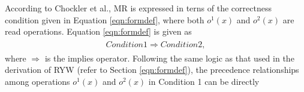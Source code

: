 \documentclass[journal,compsoc]{IEEEtran}
\begin{document}
 \par  According to Chockler et al.,
 MR is expressed in terns of the correctness condition given in Equation \ref{eqn:formdef}, %
 where both $\mathit{o}^1(x)$ and $\mathit{o}^2(x)$ are read operations. 
   Equation \ref{eqn:formdef} is given as \begin{align}\label{eqn:formdef}
\begin{split}
 Condition 1 \Rightarrow Condition 2,
  \end{split}
  \end{align}
 where $\Rightarrow$ is the implies operator. %
   Following the same logic as that used in the derivation of RYW (refer to Section \ref{eqn:formdef}), the precedence relationships among operations $\mathit{o}^1(x)$ and $\mathit{o}^2(x)$ in Condition 1 can be directly
\end{document}
